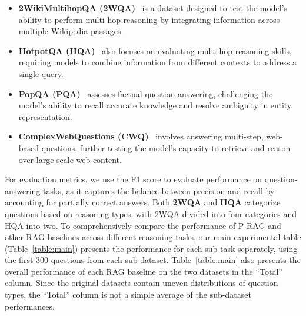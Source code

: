 \documentclass[sigconf,natbib=true,anonymous=false]{acmart}
\begin{document}
\begin{itemize}[leftmargin=*]

\item\textbf{2WikiMultihopQA (2WQA)}~\cite{ho2020constructing} is a dataset designed to test the model’s ability to perform multi-hop reasoning by integrating information across multiple Wikipedia passages.

\item\textbf{HotpotQA (HQA)}~\cite{yang2018hotpotqa} also focuses on evaluating multi-hop reasoning skills, requiring models to combine information from different contexts to address a single query.

\item\textbf{PopQA (PQA)}~\cite{mallen-etal-2023-trust} assesses factual question answering, challenging the model’s ability to recall accurate knowledge and resolve ambiguity in entity representation.

\item\textbf{ComplexWebQuestions (CWQ)}~\cite{talmor-berant-2018-web} involves answering multi-step, web-based questions, further testing the model’s capacity to retrieve and reason over large-scale web content.


\end{itemize}
\noindent For evaluation metrics, we use the F1 score to evaluate performance on question-answering tasks, as it captures the balance between precision and recall by accounting for partially correct answers. Both \textbf{2WQA} and \textbf{HQA} categorize questions based on reasoning types, with 2WQA divided into four categories and HQA into two. To comprehensively compare the performance of P-RAG and other RAG baselines across different reasoning tasks, our main experimental table (Table~\ref{table:main}) presents the performance for each sub-task separately, using the first 300 questions from each sub-dataset. Table~\ref{table:main} also presents the overall performance of each RAG baseline on the two datasets in the ``Total'' column. Since the original datasets contain uneven distributions of question types, the ``Total'' column is not a simple average of the sub-dataset performances.
\end{document}
